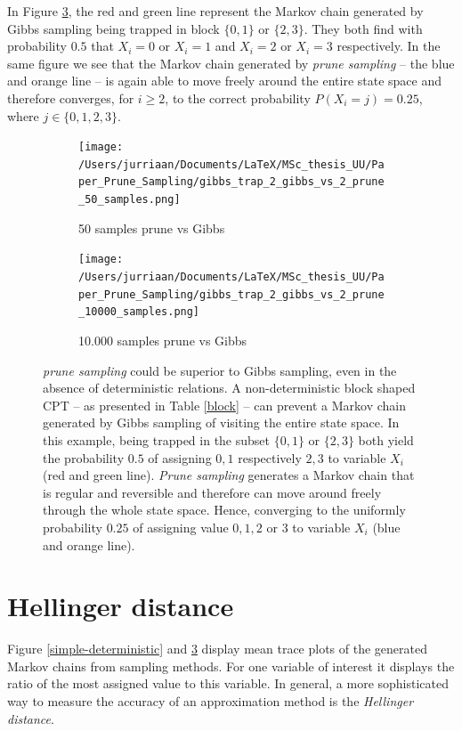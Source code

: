 \documentclass[a4paper, twoside, 11pt]{report}
\theoremstyle{plain}
\theoremstyle{definition}
\theoremstyle{remark}
\newcommand{\ps}{\textit{prune sampling }}
\begin{document}
In Figure \ref{block-BN}, the red and green line represent the Markov chain generated by Gibbs sampling being trapped in block $\{0, 1\}$ or $\{2,3\}$. They both find with probability $0.5$ that $X_i = 0$ or $X_i = 1$ and $X_i = 2$ or $X_i = 3$ respectively. In the same figure we see that the Markov chain generated by \ps -- the blue and orange line -- is again able to move freely around the entire state space and therefore converges, for $i \geq 2$, to the correct probability $P(X_i = j)= 0.25$, where $j \in \{0,1,2,3\}$.
\begin{figure}[h]
\centering
\begin{subfigure}{.49\textwidth}
  \centering
  \texttt{[image: /Users/jurriaan/Documents/LaTeX/MSc\_thesis\_UU/Paper\_Prune\_Sampling/gibbs\_trap\_2\_gibbs\_vs\_2\_prune\_50\_samples.png]}
  \caption{50 samples prune vs Gibbs}
  \label{fig:sub1}
\end{subfigure}
\begin{subfigure}{.49\textwidth}
  \centering
  \texttt{[image: /Users/jurriaan/Documents/LaTeX/MSc\_thesis\_UU/Paper\_Prune\_Sampling/gibbs\_trap\_2\_gibbs\_vs\_2\_prune\_10000\_samples.png]}
  \caption{10.000 samples prune vs Gibbs}
  \label{fig:sub2}
\end{subfigure}
\vspace{0.75pc}
\caption{\ps could be superior to Gibbs sampling, even in the absence of deterministic relations. A non-deterministic block shaped CPT -- as presented in Table \ref{block} -- can prevent a Markov chain generated by Gibbs sampling of visiting the entire state space. In this example, being trapped in the subset $\{0, 1\}$ or $\{2, 3\}$ both yield the probability $0.5$ of assigning $0,1$ respectively $2,3$ to variable $X_i$ (red and green line). \textit{Prune sampling} generates a Markov chain that is regular and reversible and therefore can move around freely through the whole state space. Hence, converging to the uniformly probability $0.25$ of assigning value $0,1,2$ or $3$ to variable $X_i$ (blue and orange line).} 
\label{block-BN}
\end{figure}

\section{Hellinger distance}
Figure \ref{simple-deterministic} and \ref{block-BN} display mean trace plots of the generated Markov chains from sampling methods. For one variable of interest it displays the ratio of the most assigned value to this variable. In general, a more sophisticated way to measure the accuracy of an approximation method is the \textit{Hellinger distance}.
\end{document}
